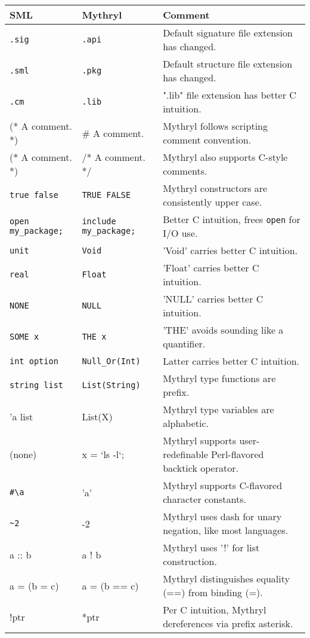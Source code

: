 \begin{tabular}{|l|l|l|} \hline
{\bf SML} & {\bf Mythryl} & {\bf Comment} \\ \hline \hline
{\tt .sig} & {\tt .api} & Default signature file extension has changed. \\ \hline
{\tt .sml} & {\tt .pkg} & Default structure file extension has changed. \\ \hline
{\tt .cm} & {\tt .lib} & ".lib" file extension has better C intuition. \\ \hline
(* A comment. *) & \# A comment. & Mythryl follows scripting comment convention. \\ \hline
(* A comment. *) & /* A comment. */ & Mythryl also supports C-style comments. \\ \hline
{\tt true false} & {\tt TRUE FALSE} & Mythryl constructors are consistently upper case. \\ \hline
{\tt open my\_package;} & {\tt include my\_package;} & Better C intuition, frees {\tt open} for I/O use. \\ \hline
{\tt unit} & {\tt Void} & 'Void' carries better C intuition. \\ \hline
{\tt real} & {\tt Float} & 'Float' carries better C intuition. \\ \hline
{\tt NONE} & {\tt NULL} & 'NULL' carries better C intuition. \\ \hline
{\tt SOME x} & {\tt THE x} & 'THE' avoids sounding like a quantifier. \\ \hline
{\tt int option} & {\tt Null\_Or(Int)} & Latter carries better C intuition. \\ \hline
{\tt string list} & {\tt List(String)} & Mythryl type functions are prefix. \\ \hline
'a list & List(X) & Mythryl type variables are alphabetic. \\ \hline
(none) & x = `ls -l`; & Mythryl supports user-redefinable Perl-flavored backtick operator. \\ \hline
\verb|#\a| & 'a' & Mythryl supports C-flavored character constants. \\ \hline
\verb|~2| & -2 & Mythryl uses dash for unary negation, like most languages. \\ \hline
a :: b & a ! b & Mythryl uses '!' for list construction. \\ \hline
a = (b = c) & a = (b == c) & Mythryl distinguishes equality (==) from binding (=). \\ \hline
!ptr & *ptr & Per C intuition, Mythryl dereferences via prefix asterisk. \\ \hline

\end{tabular}
